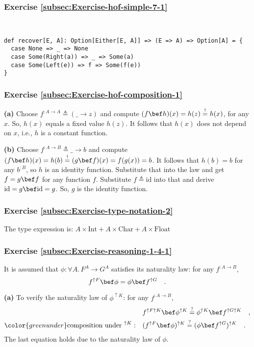 \subsubsection*{Exercise \ref{subsec:Exercise-hof-simple-7-1}}

~
\begin{lstlisting}
def recover[E, A]: Option[Either[E, A]] => (E => A) => Option[A] = {
  case None => _ => None
  case Some(Right(a)) => _ => Some(a)
  case Some(Left(e)) => f => Some(f(e))
}
\end{lstlisting}


\subsubsection*{Exercise \ref{subsec:Exercise-hof-composition-1}}

\textbf{(a)} Choose $f^{:A\rightarrow A}\triangleq(\_\rightarrow z)$
and compute $(f\bef h)(x)=h(z)\overset{!}{=}h(x)$, for any $x$.
So, $h(x)$ equals a fixed value $h(z)$. It follows that $h(x)$
does not depend on $x$, i.e., $h$ is a constant function.

\textbf{(b)} Choose $f^{:A\rightarrow B}\triangleq\_\rightarrow b$
and compute $(f\bef h)(x)=h(b)\overset{!}{=}(g\bef f)(x)=f(g(x))=b$.
It follows that $h(b)=b$ for any $b^{:B}$, so $h$ is an identity
function. Substitute that into the law and get $f=g\bef f$ for any
function $f$. Substitute $f\triangleq\text{id}$ into that and derive
$\text{id}=g\bef\text{id}=g$. So, $g$ is the identity function.

\subsubsection*{Exercise \ref{subsec:Exercise-type-notation-2}}

The type expression is: $A\times\text{Int}+A\times\text{Char}+A\times\text{Float}$

\subsubsection*{Exercise \ref{subsec:Exercise-reasoning-1-4-1}}

It is assumed that $\phi:\forall A.\,F^{A}\rightarrow G^{A}$ satisfies
its naturality law: for any $f^{:A\rightarrow B}$,
\[
f^{\uparrow F}\bef\phi=\phi\bef f^{\uparrow G}\quad.
\]

\textbf{(a)} To verify the naturality law of $\phi^{\uparrow K}$:
for any $f^{:A\rightarrow B}$,
\begin{align*}
 & f^{\uparrow F\uparrow K}\bef\phi^{\uparrow K}\overset{?}{=}\phi^{\uparrow K}\bef f^{\uparrow G\uparrow K}\quad,\\
{\color{greenunder}\text{composition under }^{\uparrow K}:}\quad & (f^{\uparrow F}\bef\phi)^{\uparrow K}\overset{?}{=}(\phi\bef f^{\uparrow G})^{\uparrow K}\quad.
\end{align*}
The last equation holds due to the naturality law of $\phi$.

